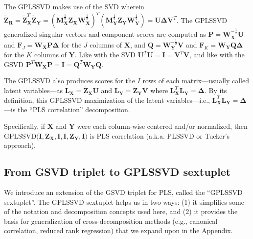 \documentclass[12pt]{article}
\begin{document}
The GPLSSVD makes use of the SVD wherein
\(\widetilde{\mathbf Z}_{\mathbf R} = \widetilde{{\mathbf Z}}_{\mathbf X}^{T}\widetilde{{\mathbf Z}}_{\mathbf Y} = ({\mathbf M}_{\mathbf X}^{\frac{1}{2}}{\mathbf Z}_{\mathbf X}{\mathbf W}_{\mathbf X}^{\frac{1}{2}})^{T}({\mathbf M}_{\mathbf Y}^{\frac{1}{2}}{\mathbf Z}_{\mathbf Y}{\mathbf W}_{\mathbf Y}^{\frac{1}{2}}) = {\mathbf U} {\boldsymbol \Delta} {\mathbf V}^{T}\).
The GPLSSVD generalized singular vectors and component scores are
computed as
\({\mathbf P} = {\mathbf W}_{{\mathbf X}}^{-\frac{1}{2}}{\mathbf U}\)
and
\({\mathbf F}_{J} = {\mathbf W}_{{\mathbf X}}{\mathbf P}{\boldsymbol \Delta}\)
for the \(J\) columns of \({\mathbf X}\), and
\({\mathbf Q} = {\mathbf W}_{{\mathbf Y}}^{-\frac{1}{2}}{\mathbf V}\)
and
\({\mathbf F}_{K} = {\mathbf W}_{{\mathbf Y}}{\mathbf Q}{\boldsymbol \Delta}\)
for the \(K\) columns of \({\mathbf Y}\). Like with the SVD
\({\mathbf U}^{T}{\mathbf U} = {\mathbf I} = {\mathbf V}^{T}{\mathbf V}\),
and like with the GSVD
\({\mathbf P}^{T}{\mathbf W}_{\mathbf X}{\mathbf P} = {\mathbf I} = {\mathbf Q}^{T}{\mathbf W}_{\mathbf Y}{\mathbf Q}\).

The GPLSSVD also produces scores for the \(I\) rows of each
matrix---usually called latent variables---as
\({\mathbf L}_{\mathbf X} = \widetilde{\mathbf Z}_{\mathbf X}{\mathbf U}\)
and
\({\mathbf L}_{\mathbf Y} = \widetilde{\mathbf Z}_{\mathbf Y}{\mathbf V}\)
where
\({\mathbf L}_{\mathbf X}^{T} {\mathbf L}_{\mathbf Y} = {\boldsymbol \Delta}\).
By its definition, this GPLSSVD maximization of the latent
variables---i.e.,
\({\mathbf L}_{\mathbf X}^{T} {\mathbf L}_{\mathbf Y} = {\boldsymbol \Delta}\)---is
the ``PLS correlation'' decomposition.

Specifically, if \({\mathbf X}\) and \({\mathbf Y}\) were each
column-wise centered and/or normalized, then
\(\mathrm{GPLSSVD(} {\mathbf I}, {\mathbf Z}_{\mathbf X}, {\mathbf I}, {\mathbf I}, {\mathbf Z}_{\mathbf Y}, {\mathbf I} \mathrm{)}\)
is PLS correlation (a.k.a. PLSSVD or Tucker's approach).

\hypertarget{from-gsvd-triplet-to-gplssvd-sextuplet}{%
\subsection{From GSVD triplet to GPLSSVD
sextuplet}\label{from-gsvd-triplet-to-gplssvd-sextuplet}}

We introduce an extension of the GSVD triplet for PLS, called the
``GPLSSVD sextuplet''. The GPLSSVD sextuplet helps us in two ways: (1)
it simplifies some of the notation and decomposition concepts used here,
and (2) it provides the basis for generalization of cross-decomposition
methods (e.g., canonical correlation, reduced rank regression) that we
expand upon in the Appendix.
\end{document}
